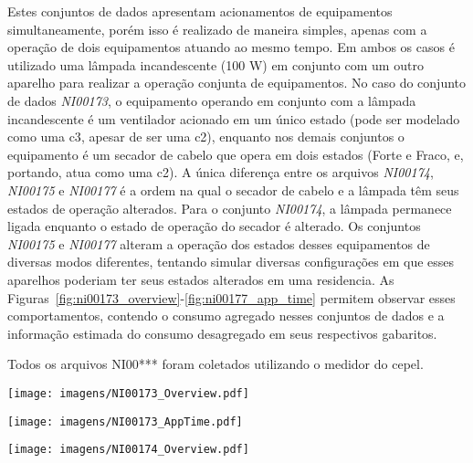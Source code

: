 Estes conjuntos de dados apresentam acionamentos de equipamentos
simultaneamente, porém isso é realizado de maneira simples, apenas com
a operação de dois equipamentos atuando ao mesmo tempo. Em ambos os
casos é utilizado uma lâmpada incandescente (100 W) em conjunto com um
outro aparelho para realizar a operação conjunta de equipamentos. No
caso do conjunto de dados \emph{NI00173}, o equipamento operando em
conjunto com a lâmpada incandescente é um ventilador acionado em um
único estado (pode ser modelado como uma \acs{c3}, apesar de ser uma
\acs{c2}), enquanto nos demais conjuntos o equipamento é um secador de
cabelo que opera em dois estados (Forte e Fraco, e, portando, atua
como uma \acs{c2}). A única diferença entre os arquivos
\emph{NI00174}, \emph{NI00175} e \emph{NI00177} é a ordem na qual o
secador de cabelo e a lâmpada têm seus estados de operação alterados.
Para o conjunto \emph{NI00174}, a lâmpada permanece ligada enquanto o
estado de operação do secador é alterado.  Os conjuntos \emph{NI00175}
e \emph{NI00177} alteram a operação dos estados desses equipamentos de
diversas modos diferentes, tentando simular diversas configurações em
que esses aparelhos poderiam ter seus estados alterados em uma
residencia. As
Figuras~\ref{fig:ni00173_overview}-\ref{fig:ni00177_app_time} permitem
observar esses comportamentos, contendo o consumo agregado nesses
conjuntos de dados e a informação estimada do consumo desagregado em
seus respectivos gabaritos.

Todos os arquivos NI00*** foram coletados utilizando o medidor do
\acs{cepel}.


\begin{sidewaysfigure}[p]
\centering
\texttt{[image: imagens/NI00173\_Overview.pdf]}
\caption{Perfil de consumo agregado para o conjunto de dados
\emph{NI00173}.}
\label{fig:ni00173_overview}
\end{sidewaysfigure}

\begin{sidewaysfigure}[p]
\centering
\texttt{[image: imagens/NI00173\_AppTime.pdf]}
\caption{Informação no gabarito para o conjunto de dados
\emph{NI00173} - consumo temporal dos equipamentos.}
\label{fig:ni00173_app_time}
\end{sidewaysfigure}

\begin{sidewaysfigure}[p]
\centering
\texttt{[image: imagens/NI00174\_Overview.pdf]}
\caption{Perfil de consumo agregado para o conjunto de dados
\emph{NI00174}.}
\label{fig:ni00174_overview}
\end{sidewaysfigure}

